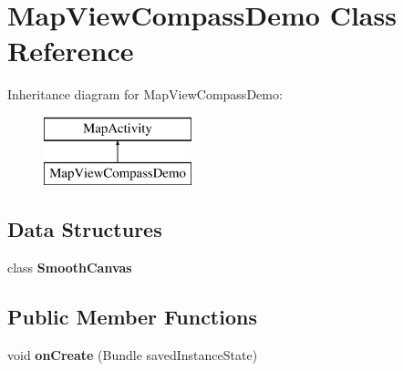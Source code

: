 \hypertarget{classcom_1_1example_1_1android_1_1apis_1_1view_1_1_map_view_compass_demo}{\section{Map\-View\-Compass\-Demo Class Reference}
\label{classcom_1_1example_1_1android_1_1apis_1_1view_1_1_map_view_compass_demo}
}
Inheritance diagram for Map\-View\-Compass\-Demo\-:\begin{figure}[H]
\begin{center}
\leavevmode
\includegraphics[height=2.000000cm]{classcom_1_1example_1_1android_1_1apis_1_1view_1_1_map_view_compass_demo}
\end{center}
\end{figure}
\subsection*{Data Structures}
\begin{DoxyCompactItemize}
\item 
class {\bfseries Smooth\-Canvas}
\end{DoxyCompactItemize}
\subsection*{Public Member Functions}
\begin{DoxyCompactItemize}
\item 
\hypertarget{classcom_1_1example_1_1android_1_1apis_1_1view_1_1_map_view_compass_demo_a85e87cb5ced88dff7c8173ecc4f636d1}{void {\bfseries on\-Create} (Bundle saved\-Instance\-State)}\label{classcom_1_1example_1_1android_1_1apis_1_1view_1_1_map_view_compass_demo_a85e87cb5ced88dff7c8173ecc4f636d1}

\end{DoxyCompactItemize}
